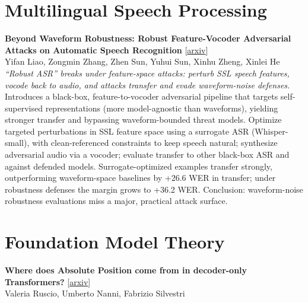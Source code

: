 \documentclass[12pt,letterpaper]{article}
\begin{document}
\medskip


\section*{Multilingual Speech Processing}

{\small\textbf{Beyond Waveform Robustness: Robust Feature-Vocoder Adversarial Attacks on Automatic Speech Recognition}} {\scriptsize[\href{https://arxiv.org/abs/2606.05678}{arxiv}]}\\
{\scriptsize Yifan Liao, Zongmin Zhang, Zhen Sun, Yuhui Sun, Xinhu Zheng, Xinlei He}\\

{\small\textit{``Robust ASR'' breaks under feature-space attacks: perturb SSL speech features, vocode back to audio, and attacks transfer and evade waveform-noise defenses.}}\\[1pt]
{\footnotesize Introduces a black-box, feature-to-vocoder adversarial pipeline that targets self-supervised representations (more model-agnostic than waveforms), yielding stronger transfer and bypassing waveform-bounded threat models. Optimize targeted perturbations in SSL feature space using a surrogate ASR (Whisper-small), with clean-referenced constraints to keep speech natural; synthesize adversarial audio via a vocoder; evaluate transfer to other black-box ASR and against defended models. Surrogate-optimized examples transfer strongly, outperforming waveform-space baselines by +26.6 WER in transfer; under robustness defenses the margin grows to +36.2 WER. Conclusion: waveform-noise robustness evaluations miss a major, practical attack surface.}

\medskip


\section*{Foundation Model Theory}

{\small\textbf{Where does Absolute Position come from in decoder-only Transformers?}} {\scriptsize[\href{https://arxiv.org/abs/2606.06160}{arxiv}]}\\
{\scriptsize Valeria Ruscio, Umberto Nanni, Fabrizio Silvestri}\\
\end{document}
